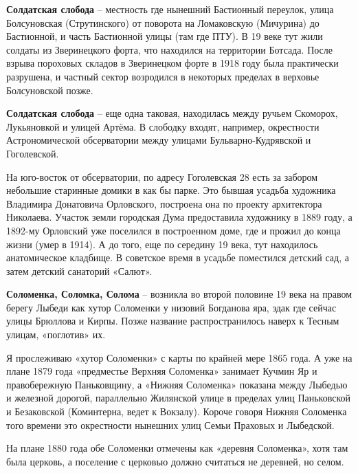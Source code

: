 \newpage

\textbf{Солдатская слобода} – местность где нынешний Бастионный переулок, улица Болсуновская (Струтинского) от поворота на Ломаковскую (Мичурина) до Бастионной, и часть Бастионной улицы (там где ПТУ). В 19 веке тут жили солдаты из Зверинецкого форта, что находился на территории Ботсада. После взрыва пороховых складов в Зверинецком форте в 1918 году была практически разрушена, и частный сектор возродился в некоторых пределах в верховье Болсуновской позже.\\

\medskip

\textbf{Солдатская слобода} – еще одна таковая, находилась между ручьем Скоморох, Лукьяновкой и улицей Артёма. В слободку входят, например, окрестности Астрономической обсерватории между улицами Бульварно-Кудрявской и Гоголевской.

На юго-восток от обсерватории, по адресу Гоголевская 28 есть за забором небольшие старинные домики в как бы парке. Это бывшая усадьба художника Владимира Донатовича Орловского, построена она по проекту архитектора Николаева. Участок земли городская Дума предоставила художнику в 1889 году, а 1892-му Орловский уже поселился в построенном доме, где и прожил до конца жизни (умер в 1914). А до того, еще по середину 19 века, тут находилось анатомическое кладбище. В советское время в усадьбе поместился детский сад, а затем детский санаторий «Салют».\\

\medskip

\textbf{Соломенка, Соломка, Солома} – возникла во второй половине 19 века на правом берегу Лыбеди как хутор Соломенки у низовий Богданова яра, эдак где сейчас улицы Брюллова и Кирпы. Позже название распространилось наверх к Тесным улицам, «поглотив» их. 

Я прослеживаю «хутор Соломенки» с карты по крайней мере 1865 года. А уже на плане 1879 года «предместье Верхняя Соломенка» занимает Кучмин Яр и правобережную Паньковщину, а «Нижняя Соломенка» показана между Лыбедью и железной дорогой, параллельно Жилянской улице в пределах улиц Паньковской и Безаковской (Коминтерна, ведет к Вокзалу). Короче говоря Нижняя Соломенка того времени это окрестности нынешних улиц Семьи Праховых и Лыбедской.

На плане 1880 года обе Соломенки отмечены как «деревня Соломенка», хотя там была церковь, а поселение с церковью должно считаться не деревней, но селом.\\

